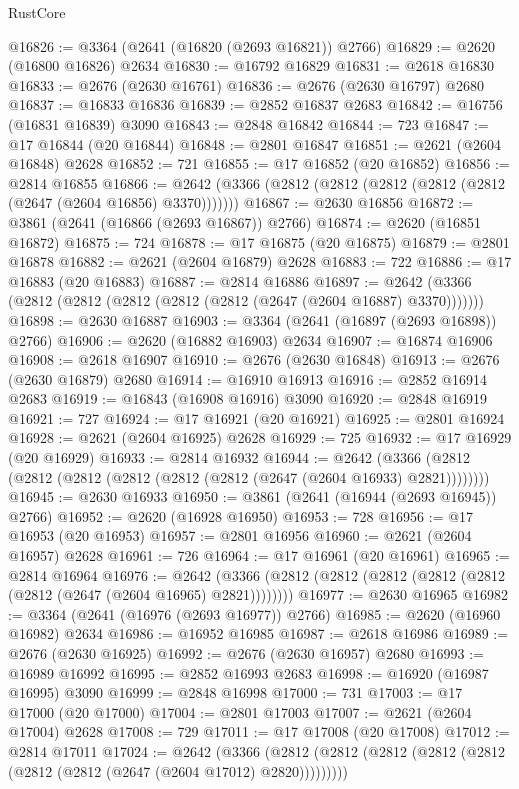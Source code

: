 \begin{lexlean}{RustCore}
\begin{coremodule}
@16826 := @3364 (@2641 (@16820 (@2693 @16821)) @2766)
@16829 := @2620 (@16800 @16826) @2634
@16830 := @16792 @16829
@16831 := @2618 @16830
@16833 := @2676 (@2630 @16761)
@16836 := @2676 (@2630 @16797) @2680
@16837 := @16833 @16836
@16839 := @2852 @16837 @2683
@16842 := @16756 (@16831 @16839) @3090
@16843 := @2848 @16842
@16844 := 723
@16847 := @17 @16844 (@20 @16844)
@16848 := @2801 @16847
@16851 := @2621 (@2604 @16848) @2628
@16852 := 721
@16855 := @17 @16852 (@20 @16852)
@16856 := @2814 @16855
@16866 := @2642 (@3366 (@2812 (@2812 (@2812 (@2812 (@2812 (@2647 (@2604 @16856) @3370)))))))
@16867 := @2630 @16856
@16872 := @3861 (@2641 (@16866 (@2693 @16867)) @2766)
@16874 := @2620 (@16851 @16872)
@16875 := 724
@16878 := @17 @16875 (@20 @16875)
@16879 := @2801 @16878
@16882 := @2621 (@2604 @16879) @2628
@16883 := 722
@16886 := @17 @16883 (@20 @16883)
@16887 := @2814 @16886
@16897 := @2642 (@3366 (@2812 (@2812 (@2812 (@2812 (@2812 (@2647 (@2604 @16887) @3370)))))))
@16898 := @2630 @16887
@16903 := @3364 (@2641 (@16897 (@2693 @16898)) @2766)
@16906 := @2620 (@16882 @16903) @2634
@16907 := @16874 @16906
@16908 := @2618 @16907
@16910 := @2676 (@2630 @16848)
@16913 := @2676 (@2630 @16879) @2680
@16914 := @16910 @16913
@16916 := @2852 @16914 @2683
@16919 := @16843 (@16908 @16916) @3090
@16920 := @2848 @16919
@16921 := 727
@16924 := @17 @16921 (@20 @16921)
@16925 := @2801 @16924
@16928 := @2621 (@2604 @16925) @2628
@16929 := 725
@16932 := @17 @16929 (@20 @16929)
@16933 := @2814 @16932
@16944 := @2642 (@3366 (@2812 (@2812 (@2812 (@2812 (@2812 (@2812 (@2647 (@2604 @16933) @2821))))))))
@16945 := @2630 @16933
@16950 := @3861 (@2641 (@16944 (@2693 @16945)) @2766)
@16952 := @2620 (@16928 @16950)
@16953 := 728
@16956 := @17 @16953 (@20 @16953)
@16957 := @2801 @16956
@16960 := @2621 (@2604 @16957) @2628
@16961 := 726
@16964 := @17 @16961 (@20 @16961)
@16965 := @2814 @16964
@16976 := @2642 (@3366 (@2812 (@2812 (@2812 (@2812 (@2812 (@2812 (@2647 (@2604 @16965) @2821))))))))
@16977 := @2630 @16965
@16982 := @3364 (@2641 (@16976 (@2693 @16977)) @2766)
@16985 := @2620 (@16960 @16982) @2634
@16986 := @16952 @16985
@16987 := @2618 @16986
@16989 := @2676 (@2630 @16925)
@16992 := @2676 (@2630 @16957) @2680
@16993 := @16989 @16992
@16995 := @2852 @16993 @2683
@16998 := @16920 (@16987 @16995) @3090
@16999 := @2848 @16998
@17000 := 731
@17003 := @17 @17000 (@20 @17000)
@17004 := @2801 @17003
@17007 := @2621 (@2604 @17004) @2628
@17008 := 729
@17011 := @17 @17008 (@20 @17008)
@17012 := @2814 @17011
@17024 := @2642
    (@3366 (@2812 (@2812 (@2812 (@2812 (@2812 (@2812 (@2812 (@2647 (@2604 @17012) @2820)))))))))

\end{coremodule}
\end{lexlean}

